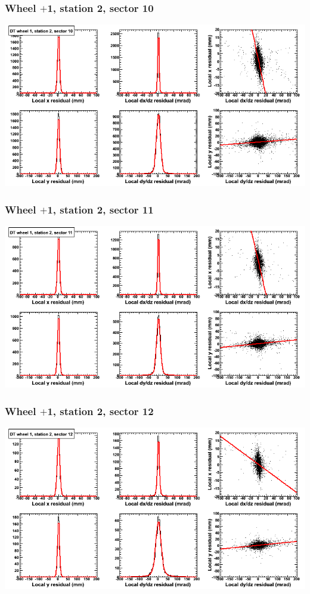 \documentclass[compress]{beamer}
\begin{document}
\begin{frame}
\frametitle{Wheel $+$1, station 2, sector 10}
\includegraphics[width=\linewidth]{tmpbell_MBwhDst2sec10.png}
\end{frame}

\begin{frame}
\frametitle{Wheel $+$1, station 2, sector 11}
\includegraphics[width=\linewidth]{tmpbell_MBwhDst2sec11.png}
\end{frame}

\begin{frame}
\frametitle{Wheel $+$1, station 2, sector 12}
\includegraphics[width=\linewidth]{tmpbell_MBwhDst2sec12.png}
\end{frame}
\end{document}

